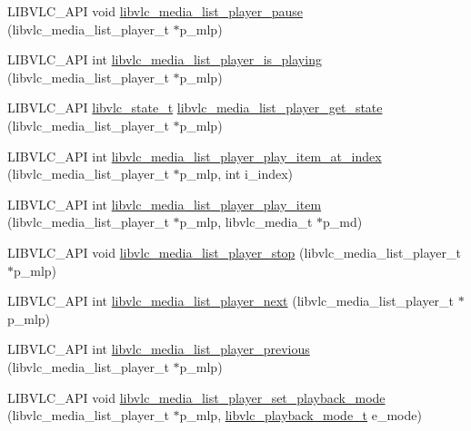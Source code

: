 \begin{DoxyCompactItemize}
L\+I\+B\+V\+L\+C\+\_\+\+A\+PI void \hyperlink{group__libvlc__media__list__player_ga405ee667bd3c08ac0d11bff9647ca806}{libvlc\+\_\+media\+\_\+list\+\_\+player\+\_\+pause} (libvlc\+\_\+media\+\_\+list\+\_\+player\+\_\+t $\ast$p\+\_\+mlp)
\item 
L\+I\+B\+V\+L\+C\+\_\+\+A\+PI int \hyperlink{group__libvlc__media__list__player_gaa325957bb8304d3898686b6bb8eaaec7}{libvlc\+\_\+media\+\_\+list\+\_\+player\+\_\+is\+\_\+playing} (libvlc\+\_\+media\+\_\+list\+\_\+player\+\_\+t $\ast$p\+\_\+mlp)
\item 
L\+I\+B\+V\+L\+C\+\_\+\+A\+PI \hyperlink{group__libvlc__media_gac88ad60037ea05e1f23675a2ebe31efc}{libvlc\+\_\+state\+\_\+t} \hyperlink{group__libvlc__media__list__player_gaed0e4d07d32dab2dff865d4f632e55cd}{libvlc\+\_\+media\+\_\+list\+\_\+player\+\_\+get\+\_\+state} (libvlc\+\_\+media\+\_\+list\+\_\+player\+\_\+t $\ast$p\+\_\+mlp)
\item 
L\+I\+B\+V\+L\+C\+\_\+\+A\+PI int \hyperlink{group__libvlc__media__list__player_ga95fbed543f78fee243f31d45d638dd4c}{libvlc\+\_\+media\+\_\+list\+\_\+player\+\_\+play\+\_\+item\+\_\+at\+\_\+index} (libvlc\+\_\+media\+\_\+list\+\_\+player\+\_\+t $\ast$p\+\_\+mlp, int i\+\_\+index)
\item 
L\+I\+B\+V\+L\+C\+\_\+\+A\+PI int \hyperlink{group__libvlc__media__list__player_ga37a259c6a4216de2a6dca317eab97156}{libvlc\+\_\+media\+\_\+list\+\_\+player\+\_\+play\+\_\+item} (libvlc\+\_\+media\+\_\+list\+\_\+player\+\_\+t $\ast$p\+\_\+mlp, libvlc\+\_\+media\+\_\+t $\ast$p\+\_\+md)
\item 
L\+I\+B\+V\+L\+C\+\_\+\+A\+PI void \hyperlink{group__libvlc__media__list__player_ga06d8e55e82ef254099826f33ff09ff69}{libvlc\+\_\+media\+\_\+list\+\_\+player\+\_\+stop} (libvlc\+\_\+media\+\_\+list\+\_\+player\+\_\+t $\ast$p\+\_\+mlp)
\item 
L\+I\+B\+V\+L\+C\+\_\+\+A\+PI int \hyperlink{group__libvlc__media__list__player_ga9f0ed5dfcc90d36b96942e9fb9e7b748}{libvlc\+\_\+media\+\_\+list\+\_\+player\+\_\+next} (libvlc\+\_\+media\+\_\+list\+\_\+player\+\_\+t $\ast$p\+\_\+mlp)
\item 
L\+I\+B\+V\+L\+C\+\_\+\+A\+PI int \hyperlink{group__libvlc__media__list__player_ga0b6550b4d026f04220203b2130573b90}{libvlc\+\_\+media\+\_\+list\+\_\+player\+\_\+previous} (libvlc\+\_\+media\+\_\+list\+\_\+player\+\_\+t $\ast$p\+\_\+mlp)
\item 
L\+I\+B\+V\+L\+C\+\_\+\+A\+PI void \hyperlink{group__libvlc__media__list__player_ga90ec154fa4c8d0c336404653f3c2223a}{libvlc\+\_\+media\+\_\+list\+\_\+player\+\_\+set\+\_\+playback\+\_\+mode} (libvlc\+\_\+media\+\_\+list\+\_\+player\+\_\+t $\ast$p\+\_\+mlp, \hyperlink{group__libvlc__media__list__player_ga1f0139f9220d7578fab37a3c1a74af9c}{libvlc\+\_\+playback\+\_\+mode\+\_\+t} e\+\_\+mode)
\end{DoxyCompactItemize}


